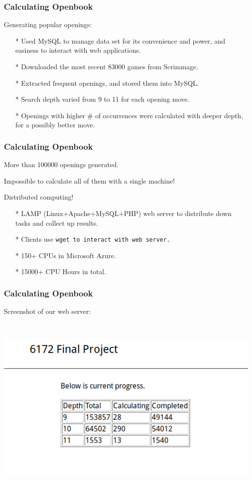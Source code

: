 \documentclass[10pt]{beamer}
\begin{document}
	\begin{frame}
		\frametitle{Calculating Openbook}
		Generating popular openings:
		\begin{itemize}
		\item[*] Used MySQL to manage data set for its convenience and power,
		and easiness to interact with web applications.
		\item[*] Downloaded the most recent 83000 games from Scrimmage.
		\item[*] Extracted frequent openings, and stored them into MySQL.
		\item[*] Search depth varied from \textcolor{fgreen}{9} to \textcolor{fgreen}{11} for each opening move.
		\item[*] Openings with higher \# of occurrences were calculated with deeper depth, for a possibly better move.
		\end{itemize}
	\end{frame}

	\begin{frame}
		\frametitle{Calculating Openbook}
		More than \textcolor{dred}{100000} openings generated.

		Impossible to calculate all of them with a single machine!\pause

		\textcolor{fgreen}{Distributed computing!}

		\begin{itemize}
		\item[*] LAMP (Linux+Apache+MySQL+PHP) web server to distribute down tasks and collect up results.
		\item[*] Clients use \tt{wget} to interact with web server.
		\item[*] \textcolor{fgreen}{150+} CPUs in Microsoft Azure.
		\item[*] \textcolor{fgreen}{15000+} CPU Hours in total.
		\end{itemize}
	\end{frame}

	\begin{frame}
		\frametitle{Calculating Openbook}

		Screenshot of our web server:

		\

		\includegraphics[scale=0.5]{screenshot1.png}
	\end{frame}
\end{document}
